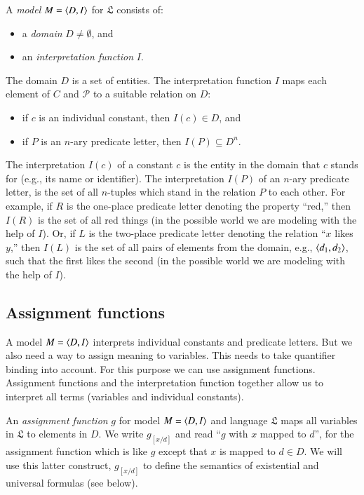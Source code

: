 \documentclass[nobib,nofonts]{tufte-handout}
\begin{document}
A \emph{model} $M = \left \langle D,I\right\rangle$ for $\mathfrak{L}$ consists of:
\begin{multicols}{2}
  \begin{itemize}
    \item[] a \emph{domain} $D \neq \emptyset$, and
    \item[] an \emph{interpretation function} $I$.
  \end{itemize}
\end{multicols}
\noindent The domain $D$ is a set of entities.
The interpretation function $I$ maps each element of $C$ and $\mathcal{P}$ to a suitable relation on $D$:
\begin{itemize}
  \item[] if $c$ is an individual constant, then $I(c) \in D$, and
  \item[] if $P$ is an $n$-ary predicate letter, then $I(P) \subseteq D^n$.
\end{itemize}
The interpretation $I(c)$ of a constant $c$ is the entity in the domain that $c$ stands for (e.g., its name or identifier).
The interpretation $I(P)$ of an $n$-ary predicate letter, is the set of all $n$-tuples which stand in the relation $P$ to each other.
For example, if $R$ is the one-place predicate letter denoting the property ``red,'' then $I(R)$ is the set of all red things (in the possible world we are modeling with the help of $I$).
Or, if $L$ is the two-place predicate letter denoting the relation ``$x$ likes $y$,'' then $I(L)$ is the set of all pairs of elements from the domain, e.g., $\left \langle d_{1}, d_{2}\right\rangle$, such that the first likes the second (in the possible world we are modeling with the help of $I$).

\subsection{Assignment functions}
\label{sec:assignments--term}

A model $M = \left \langle D,I\right\rangle$ interprets individual constants and predicate letters.
But we also need a way to assign meaning to variables.
This needs to take quantifier binding into account.
For this purpose we can use assignment functions.
Assignment functions and the interpretation function together allow us to interpret all terms (variables and individual constants).

An \emph{assignment function} $g$ for model $M = \left \langle D,I\right\rangle$ and language $\mathfrak{L}$ maps all variables in $\mathfrak{L}$ to elements in $D$.
We write $g_{[x/d]}$ and read ``$g$ with $x$ mapped to $d$'', for the assignment function which is like $g$ except that $x$ is mapped to $d \in D$.
We will use this latter construct, $g_{[x/d]}$ to define the semantics of existential and universal formulas (see below).
\end{document}
